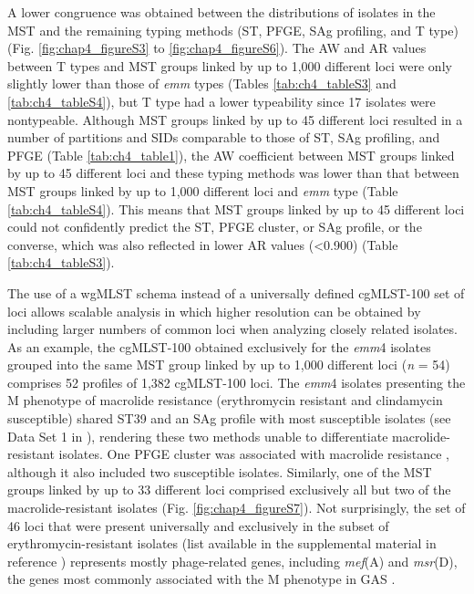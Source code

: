 A lower congruence was obtained between the distributions of isolates in the \ac{MST} and the remaining typing methods (\ac{ST}, \ac{PFGE}, SAg profiling, and T type) (Fig. \ref{fig:chap4_figureS3} to \ref{fig:chap4_figureS6}). The \ac{AW} and \ac{AR} values between T types and \ac{MST} groups linked by up to 1,000 different loci were only slightly lower than those of \textit{emm} types (Tables \ref{tab:ch4_tableS3} and \ref{tab:ch4_tableS4}), but T type had a lower typeability since 17 isolates were nontypeable. Although \ac{MST} groups linked by up to 45 different loci resulted in a number of partitions and \ac{SID}s comparable to those of \ac{ST}, SAg profiling, and \ac{PFGE} (Table \ref{tab:ch4_table1}), the \ac{AW} coefficient between \ac{MST} groups linked by up to 45 different loci and these typing methods was lower than that between \ac{MST} groups linked by up to 1,000 different loci and \textit{emm} type (Table \ref{tab:ch4_tableS4}). This means that \ac{MST} groups linked by up to 45 different loci could not confidently predict the \ac{ST}, \ac{PFGE} cluster, or SAg profile, or the converse, which was also reflected in lower \ac{AR} values (<0.900) (Table \ref{tab:ch4_tableS3}).

The use of a \ac{wgMLST} schema instead of a universally defined cgMLST-100 set of loci allows scalable analysis in which higher resolution can be obtained by including larger numbers of common loci when analyzing closely related isolates. As an example, the cgMLST-100 obtained exclusively for the \textit{emm}4 isolates grouped into the same \ac{MST} group linked by up to 1,000 different loci (\textit{n} = 54) comprises 52 profiles of 1,382 cgMLST-100 loci. The \textit{emm}4 isolates presenting the M phenotype of macrolide resistance (erythromycin resistant and clindamycin susceptible) shared ST39 and an SAg profile with most susceptible isolates (see Data Set 1 in \cite{friaes_supplemental_2023}), rendering these two methods unable to differentiate macrolide-resistant isolates. One \ac{PFGE} cluster was associated with macrolide resistance \cite{silva-costa_differences_2012}, although it also included two susceptible isolates. Similarly, one of the \ac{MST} groups linked by up to 33 different loci comprised exclusively all but two of the macrolide-resistant isolates (Fig. \ref{fig:chap4_figureS7}). Not surprisingly, the set of 46 loci that were present universally and exclusively in the subset of erythromycin-resistant isolates (list available in the supplemental material in reference \cite{friaes_supplemental_2023}) represents mostly phage-related genes, including \textit{mef}(A) and \textit{msr}(D), the genes most commonly associated with the M phenotype in \ac{GAS} \cite{silva-costa_macrolide-resistant_2015, iannelli_type_2018}.

